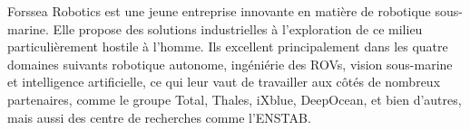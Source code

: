 Forssea Robotics est une jeune entreprise innovante en matière de robotique sous-marine. Elle propose des solutions industrielles à l'exploration de ce milieu particulièrement hostile à l'homme. Ils excellent principalement dans les quatre domaines suivants robotique autonome, ingéniérie des \gls{ROV}s, vision sous-marine et intelligence artificielle, ce qui leur vaut de travailler aux côtés de nombreux partenaires, comme le groupe Total, Thales, iXblue, DeepOcean, et bien d'autres, mais aussi des centre de recherches comme l'\gls{ENSTAB}.